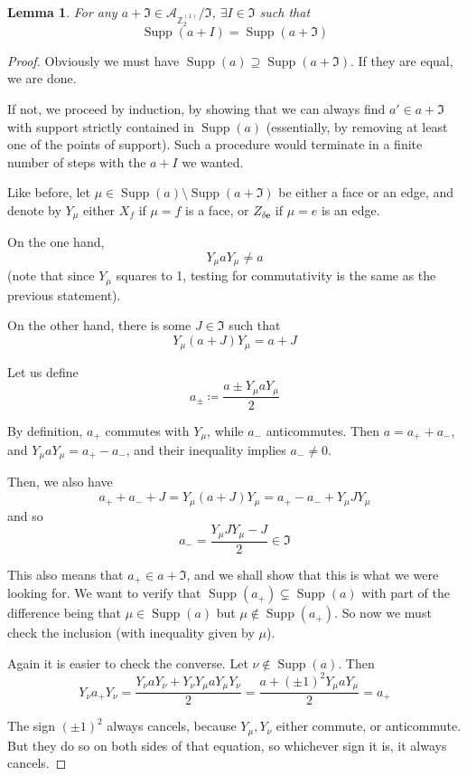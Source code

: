 \documentclass[aps,twocolumn,prx,floatfix,preprintnumbers, nofootinbib,10pt]{revtex4-2}
\numberwithin{equation}{section}
\newtheorem{lemma}[theorem]{Lemma}
\theoremstyle{definition}
\theoremstyle{remark}
\theoremstyle{claim}
\newcommand{\be}{\begin{equation}}
\newcommand{\ee}{\end{equation}}
\newcommand{\Z}{{\mathbb Z}}
\newcommand{\mc}[1]{\mathcal{#1}}
\begin{document}
\begin{lemma}\label{lemma:exact_support}
 For any $a + \mathfrak{I} \in \mc{A}_{\Z_2^{(1)}} / \mathfrak{I}$, $\exists I \in \mathfrak{I}$ such that
 \be
 \operatorname{Supp}(a + I) = \operatorname{Supp}(a + \mathfrak{I})
 \ee
\end{lemma}

\begin{proof}
 Obviously we must have $\operatorname{Supp}(a) \supseteq \operatorname{Supp}(a + \mathfrak{I})$. If they are equal, we are done.

 If not, we proceed by induction, by showing that we can always find $a' \in a + \mathfrak{I}$ with support strictly contained in $\operatorname{Supp}(a)$ (essentially, by removing at least one of the points of support). Such a procedure would terminate in a finite number of steps with the $a + I$ we wanted.

 Like before, let $\mu \in \operatorname{Supp}(a) \setminus \operatorname{Supp}(a + \mathfrak{I})$ be either a face or an edge, and denote by $Y_\mu$ either $X_f$ if $\mu = f$ is a face, or $Z_{\delta \bm{e}}$ if $\mu = e$ is an edge.

 On the one hand,
 \be
 Y_\mu a Y_\mu \neq a
 \ee
 (note that since $Y_\mu$ squares to 1, testing for commutativity is the same as the previous statement).

 On the other hand, there is some $J \in \mathfrak{I}$ such that
 \be
 Y_\mu (a + J) Y_\mu = a + J
 \ee

 Let us define
 \be
 a_\pm \coloneqq \frac{a \pm Y_\mu a Y_\mu}{2}
 \ee

 By definition, $a_{+}$ commutes with $Y_\mu$, while $a_{-}$ anticommutes. Then $a = a_{+} + a_{-}$, and $Y_\mu a Y_\mu = a_{+} - a_{-}$, and their inequality implies $a_{-} \neq 0$.

 Then, we also have
 \be
 a_{+} + a_{-} + J = Y_\mu (a + J) Y_\mu = a_{+} - a_{-} + Y_\mu J Y_\mu
 \ee
 and so
 \be
 a_{-} = \frac{Y_\mu J Y_\mu - J}{2} \in \mathfrak{I}
 \ee

 This also means that $a_{+} \in a + \mathfrak{I}$, and we shall show that this is what we were looking for. We want to verify that $\operatorname{Supp}(a_{+}) \subsetneq \operatorname{Supp}(a)$ with part of the difference being that $\mu \in \operatorname{Supp}(a)$ but $\mu \notin \operatorname{Supp}(a_{+})$. So now we must check the inclusion (with inequality given by $\mu$).

 Again it is easier to check the converse. Let $\nu \notin \operatorname{Supp}(a)$. Then
 \be
 Y_\nu a_{+} Y_\nu = \frac{Y_\nu a Y_\nu + Y_\nu Y_\mu a Y_\mu Y_\nu}{2} = \frac{a + (\pm 1)^2 Y_\mu a Y_\mu}{2} = a_{+}
 \ee

 The sign $(\pm 1)^2$ always cancels, because $Y_\mu, Y_\nu$ either commute, or anticommute. But they do so on both sides of that equation, so whichever sign it is, it always cancels.
\end{proof}
\end{document}
